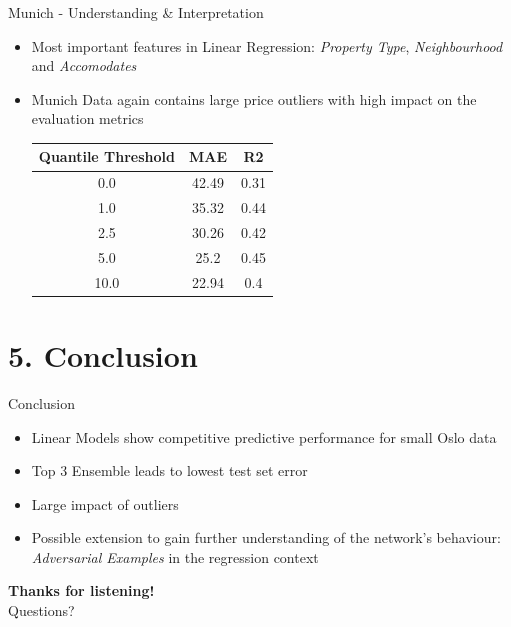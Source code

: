 \documentclass[ngerman,inputenc]{beamer}
\begin{document}
\begin{frame}{Munich - Understanding \& Interpretation}
  \begin{itemize}
    \item Most important features in Linear Regression: \emph{Property Type}, \emph{Neighbourhood} and \emph{Accomodates}
    \item Munich Data again contains large price outliers with high impact on the evaluation metrics
          \vspace{1em}
          \begin{table}[h]
            \centering
            \begin{tabular}{@{}ccc@{}}
              \toprule
              Quantile Threshold & MAE   & R2   \\ \midrule
              0.0                & 42.49 & 0.31 \\
              1.0                & 35.32 & 0.44 \\
              2.5                & 30.26 & 0.42 \\
              5.0                & 25.2  & 0.45 \\
              10.0               & 22.94 & 0.4  \\ \bottomrule
            \end{tabular}
            \label{tab:munich-outliers}
          \end{table}
  \end{itemize}
\end{frame}


\section{5. Conclusion}

\begin{frame}{Conclusion}
  \begin{itemize}
    \item Linear Models show competitive predictive performance for small Oslo data
    \item Top 3 Ensemble leads to lowest test set error
    \item Large impact of outliers
    \item Possible extension to gain further understanding of the network's behaviour: \emph{Adversarial Examples} in the regression context
  \end{itemize}
\end{frame}


\begin{frame}

  \begin{center}
    \LARGE{\textbf{Thanks for listening!}}\\[10mm]
    \large{Questions?}
  \end{center}

\end{frame}
\end{document}

